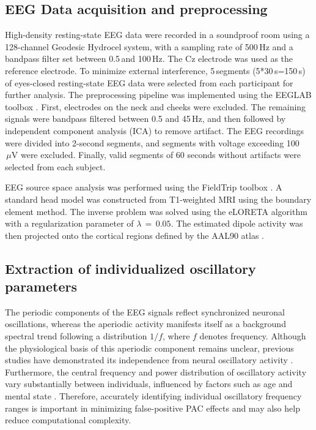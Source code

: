 \documentclass[lettersize,journal]{IEEEtran}
\begin{document}
\subsection{EEG Data acquisition and preprocessing}
High-density resting-state EEG data were recorded in a soundproof room using a 128-channel Geodesic Hydrocel system, with a sampling rate of 500\,Hz and a bandpass filter set between 0.5\,and 100\,Hz. The Cz electrode was used as the reference electrode. To minimize external interference, 5\,segments (5*30\,s=150\,s) of eyes-closed resting-state EEG data were selected from each participant for further analysis. The preprocessing pipeline was implemented using the EEGLAB toolbox \cite{delorme2004eeglab}. First, electrodes on the neck and cheeks were excluded. The remaining signals were bandpass filtered between 0.5 and 45\,Hz, and then followed by independent component analysis (ICA) to remove artifact.
The EEG recordings were divided into 2-second segments, and segments with voltage exceeding 100\,$\,\mu\mathrm{V}$ were excluded. Finally, valid segments of 60 seconds without artifacts were selected from each subject.

EEG source space analysis was performed using the FieldTrip toolbox  \cite{oostenveld2011fieldtrip}. A standard head model was constructed from T1-weighted MRI using the boundary element method. The inverse problem was solved using the eLORETA algorithm  \cite{gramfort2010openmeeg} with a regularization parameter of \(\lambda\,=\,0.05 \). The estimated dipole activity was then projected onto the cortical regions defined by the AAL90 atlas \cite{tzourio2002automated}.

\subsection{Extraction of individualized oscillatory parameters}
The periodic components of the EEG signals reflect synchronized neuronal oscillations, whereas the aperiodic activity manifests itself as a background spectral trend following a distribution $1/f$, where $f$ denotes frequency. Although the physiological basis of this aperiodic component remains unclear, previous studies have demonstrated its independence from neural oscillatory activity  \cite{brake2024neurophysiological}. Furthermore, the central frequency and power distribution of oscillatory activity vary substantially between individuals, influenced by factors such as age and mental state  \cite{turner2023developmental}. Therefore, accurately identifying individual oscillatory frequency ranges is important in minimizing false-positive PAC effects and may also help reduce computational complexity.
\end{document}
